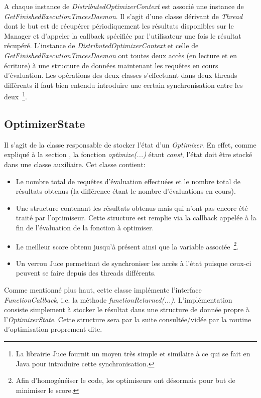 \documentclass[a4paper, 11pt]{report}
\begin{document}
A chaque instance de \textit{DistributedOptimizerContext} est associé une instance de \textit{GetFinishedExecutionTracesDaemon}. Il s'agit d'une classe dérivant de \textit{Thread} dont le but est de récupérer périodiquement les résultats disponibles sur le Manager et d'appeler la callback spécifiée par l'utilisateur une fois le résultat récupéré. L'instance de \textit{DistributedOptimizerContext} et celle de \textit{GetFinishedExecutionTracesDaemon} ont toutes deux accès (en lecture et en écriture) à une structure de données maintenant les requêtes en cours d'évaluation. Les opérations des deux classes s'effectuant dans deux threads différents il faut bien entendu introduire une certain synchronisation entre les deux~\footnote{La librairie Juce fournit un moyen très simple et similaire à ce qui se fait en Java pour introduire cette synchronisation.}.


\subsection{OptimizerState}
Il s'agit de la classe responsable de stocker l'état d'un \textit{Optimizer}. En effet, comme expliqué à la section %
, la fonction \textit{optimize(...)} étant \textit{const}, l'état doit être stocké dans une classe auxiliaire. Cet classe contient:
\begin{itemize}
\item Le nombre total de requêtes d'évaluation effectuées et le nombre total de résultats obtenus (la différence étant le nombre d'évaluations en cours).
\item Une structure contenant les résultats obtenus mais qui n'ont pas encore été traité par l'optimiseur. Cette structure est remplie via la callback appelée à la fin de l'évaluation de la fonction à optimiser.
\item Le meilleur score obtenu jusqu'à présent ainsi que la variable associée~\footnote{Afin d'homogénéiser le code, les optimiseurs ont désormais pour but de minimiser le score.}.
\item Un verrou Juce permettant de synchroniser les accès à l'état puisque ceux-ci peuvent se faire depuis des threads différents.
\end{itemize}

Comme mentionné plus haut, cette classe implémente l'interface \textit{FunctionCallback}, i.e. la méthode \textit{functionReturned(...)}. L'implémentation consiste simplement à stocker le résultat dans une structure de donnée propre à l'\textit{OptimizerState}. Cette structure sera par la suite consultée/vidée par la routine d'optimisation proprement dite.
\end{document}
